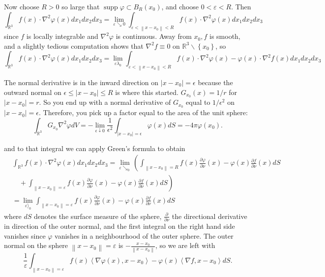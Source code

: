 \documentclass[12pt]{article}
\begin{document}
Now choose \(R>0\) so large that \(\operatorname{supp} \varphi \subset B_R\left(x_0\right)\), and choose \(0<\varepsilon<R\). Then
\[
\int_{\mathbb{R}^3} f(x) \cdot \nabla^2 \varphi(x) d x_1 d x_2 d x_3=\lim _{\varepsilon \searrow 0} \int_{\varepsilon<\left\|x-x_0\right\|<R} f(x) \cdot \nabla^2 \varphi(x) d x_1 d x_2 d x_3
\]
since \(f\) is locally integrable and \(\nabla^2 \varphi\) is continuous.
Away from \(x_0, f\) is smooth, and a slightly tedious computation shows that \(\nabla^2 f \equiv 0\) on \(\mathbb{R}^3 \backslash\left\{x_0\right\}\), so
\[
\int_{\mathbb{R}^3} f(x) \cdot \nabla^2 \varphi(x) d x_1 d x_2 d x_3=\lim _{\varepsilon \lambda_0} \int_{\varepsilon<\left\|x-x_0\right\|<R} f(x) \cdot \nabla^2 \varphi(x)-\varphi(x) \cdot \nabla^2 f(x) d x_1 d x_2 d x_3
\]



The normal derivative is in the inward direction on \(\left|x-x_0\right|=\epsilon\) because the outward normal on \(\epsilon \leq\left|x-x_0\right| \leq R\) is where this started. \(G_{x_0}(x)=1 / r\) for \(\left|x-x_0\right|=r\). So you end up with a normal derivative of \(G_{x_0}\) equal to \(1 / \epsilon^2\) on \(\left|x-x_0\right|=\epsilon\). Therefore, you pick up a factor equal to the area of the unit sphere:
\[
\int_{\mathbb{R}^3} G_{x_0} \nabla^2 \varphi d V=-\lim _{\epsilon \downarrow 0} \frac{1}{\epsilon^2} \int_{\left|x-x_0\right|=\epsilon} \varphi(x) d S=-4 \pi \varphi\left(x_0\right) .
\]


and to that integral we can apply Green's formula to obtain
\[
\begin{aligned}
& \int_{\mathbb{R}^3} f(x) \cdot \nabla^2 \varphi(x) d x_1 d x_2 d x_3= \lim _{\varepsilon \searrow_0}\left(\int_{\left\|x-x_0\right\|=R} f(x) \frac{\partial \varphi}{\partial \nu}(x)-\varphi(x) \frac{\partial f}{\partial \nu}(x) d S\right. \\
&\left.\quad+\int_{\left\|x-x_0\right\|=\varepsilon} f(x) \frac{\partial \varphi}{\partial \nu}(x)-\varphi(x) \frac{\partial f}{\partial \nu}(x) d S\right) \\
&=\lim _{\varepsilon\rangle_0} \int_{\left\|x-x_0\right\|=\varepsilon} f(x) \frac{\partial \varphi}{\partial \nu}(x)-\varphi(x) \frac{\partial f}{\partial \nu}(x) d S
\end{aligned}
\]
where \(d S\) denotes the surface measure of the sphere, \(\frac{\partial}{\partial \nu}\) the directional derivative in direction of the outer normal, and the first integral on the right hand side vanishes since \(\varphi\) vanishes in a neighbourhood of the outer sphere. The outer normal on the sphere \(\left\|x-x_0\right\|=\varepsilon\) is \(-\frac{x-x_0}{\left\|x-x_0\right\|}\),
so we are left with
\[
\frac{1}{\varepsilon} \int_{\left\|x-x_0\right\|=\varepsilon} f(x)\left\langle\nabla \varphi(x), x-x_0\right\rangle-\varphi(x)\left\langle\nabla f, x-x_0\right\rangle d S .
\]
\end{document}
